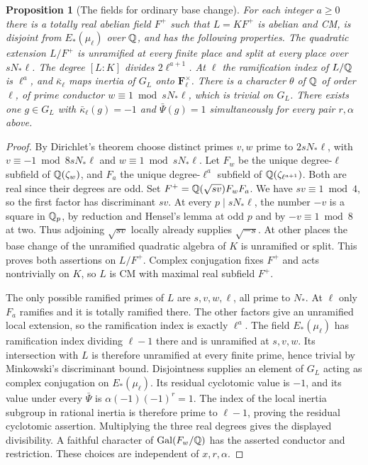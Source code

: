 \documentclass[a4paper,11pt]{article}
\newtheorem{proposition}{Proposition}[section]
\theoremstyle{definition}
\theoremstyle{remark}
\numberwithin{equation}{section}
\begin{document}
\begin{proposition}[The fields for ordinary base change]\label{prop:auxfield361}
For each integer \(a\ge0\) there is a totally real abelian field
\(F^+\) such that \(L=KF^+\) is abelian and CM, is disjoint from
\(E_*(\mu_\ell)\) over \(\mathbb Q\), and has the following properties.
The quadratic extension \(L/F^+\) is unramified at every finite
place and split at every place over \(sN_*\ell\).
The degree \([L:K]\) divides \(2\ell^{a+1}\).
At \(\ell\) the ramification index of \(L/\mathbb Q\) is \(\ell^a\),
and \(\bar\kappa_\ell\) maps inertia of \(G_L\) onto
\(\mathbf F_\ell^\times\). There is a character \(\theta\) of
\(\mathbb Q\) of order \(\ell\), of prime conductor \(w\equiv1\bmod sN_*\ell\),
which is trivial on \(G_L\). There exists one \(g\in G_L\) with
\(\bar\kappa_\ell(g)=-1\) and \(\bar\Psi(g)=1\) simultaneously
for every pair \(r,\alpha\) above.
\end{proposition}
\begin{proof}
By Dirichlet's theorem choose distinct primes \(v,w\) prime to
\(2sN_*\ell\), with \(v\equiv-1\bmod 8sN_*\ell\) and
\(w\equiv1\bmod sN_*\ell\). Let \(F_w\) be the unique degree-\(\ell\)
subfield of \(\mathbb Q(\zeta_w)\), and \(F_a\) the unique degree-\(\ell^a\)
subfield of \(\mathbb Q(\zeta_{\ell^{a+1}})\). Both are real since their
degrees are odd. Set \(F^+=\mathbb Q(\sqrt{sv})F_wF_a\).
We have \(sv\equiv1\bmod4\), so the first factor has discriminant
\(sv\). At every \(p\mid sN_*\ell\), the number \(-v\) is a square
in \(\mathbb Q_p\), by reduction and Hensel's lemma at odd \(p\) and by
\(-v\equiv1\bmod8\) at two. Thus adjoining \(\sqrt{sv}\) locally
already supplies \(\sqrt{-s}\). At other places the base change
of the unramified quadratic algebra of \(K\) is unramified or split.
This proves both assertions on \(L/F^+\). Complex conjugation
fixes \(F^+\) and acts nontrivially on \(K\), so \(L\) is CM with
maximal real subfield \(F^+\).

The only possible ramified primes of \(L\) are \(s,v,w,\ell\),
all prime to \(N_*\). At \(\ell\) only \(F_a\) ramifies and it
is totally ramified there. The other factors give an unramified
local extension, so the ramification index is exactly \(\ell^a\).
The field \(E_*(\mu_\ell)\) has ramification index dividing
\(\ell-1\) there and is unramified at \(s,v,w\). Its intersection
with \(L\) is therefore unramified at every finite prime, hence
trivial by Minkowski's discriminant bound. Disjointness supplies
an element of \(G_L\) acting as complex conjugation on
\(E_*(\mu_\ell)\). Its residual cyclotomic value is \(-1\), and
its value under every \(\bar\Psi\) is
\(\alpha(-1)(-1)^r=1\). The index of the local inertia subgroup in rational
inertia is therefore prime to \(\ell-1\), proving the residual
cyclotomic assertion. Multiplying the three real degrees gives
the displayed divisibility. A faithful character of
\(\operatorname{Gal}(F_w/\mathbb Q)\) has the asserted conductor and
restriction. These choices are independent of \(x,r,\alpha\).
\end{proof}
\end{document}
